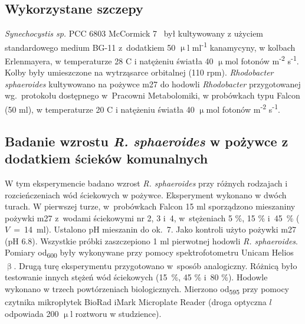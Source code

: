 \subsection{Wykorzystane szczepy}\label{subsec:szczepy}
\textit{Synechocystis sp.} PCC 6803 McCormick 7~\cite{Puchalski2021}
był kultywowany z użyciem standardowego medium BG-11 z~dodatkiem 50
$\upmu$l ml\textsuperscript{-1} kanamycyny, w kolbach Erlenmayera,
w temperaturze 28 \degree C i natężeniu światła
40 $\upmu$mol fotonów m\textsuperscript{-2} s\textsuperscript{-1}.
Kolby były umieszczone na wytrząsarce orbitalnej (110 rpm).
\textit{Rhodobacter sphaeroides} kultywowano na pożywce \acrshort{m27}
do hodowli \textit{Rhodobacter} przygotowanej wg.\ protokołu
dostępnego w~Pracowni Metabolomiki, w probówkach typu
Falcon (50 ml), w temperaturze 20 \degree C i natężeniu światła
40 $\upmu$mol fotonów m\textsuperscript{-2} s\textsuperscript{-1}.

\subsection{Badanie wzrostu \textit{R. sphaeroides} w pożywce z dodatkiem ścieków komunalnych}\label{subsec:rhodobacter}
W tym eksperymencie badano wzrost \textit{R. sphaeroides} przy
różnych rodzajach i rozcieńczeniach wód ściekowych w pożywce.
Eksperyment wykonano w dwóch turach.
W pierwszej turze, w~probówkach Falcon 15 ml sporządzono
mieszaniny pożywki \acrshort{m27} z~wodami ściekowymi nr 2, 3 i~4,
w~stężeniach 5 \%, 15 \% i~45~\% ($V$~=~14~ml).
Ustalono pH mieszanin do ok.\ 7.
Jako kontroli użyto pożywki \acrshort{m27} (pH 6.8).
Wszystkie próbki zaszczepiono 1 ml pierwotnej hodowli
\textit{R. sphaeroides}.
Pomiary \acrshort{od}\textsubscript{600} były wykonywane przy pomocy
spektrofotometru Unicam Helios $\upbeta$.
Drugą turę eksperymentu przygotowano w~sposób analogiczny.
Różnicą było testowanie innych stężeń wód ściekowych
(15~\%, 45 \% i~80 \%).
Hodowle wykonano w trzech powtórzeniach biologicznych.
Mierzono \acrshort{od}\textsubscript{595} przy pomocy czytnika
mikropłytek BioRad iMark Microplate Reader
(droga optyczna $l$ odpowiada 200 $\upmu$l roztworu w studzience).

